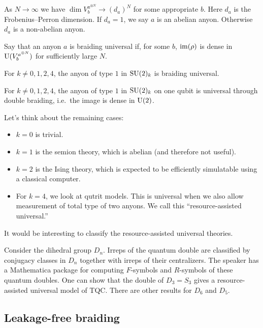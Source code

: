 \documentclass{amsart}
\begin{document}
As $N \to \infty$ we have $\dim V_b^{a^{\otimes N}} \to (d_a)^N$ for some appropriate $b$.
Here $d_a$ is the Frobenius--Perron dimension.
If $d_a = 1$, we say $a$ is an abelian anyon.
Otherwise $d_a$ is a non-abelian anyon.

Say that an anyon $a$ is braiding universal if, for some $b$, $\operatorname{im}(\rho)$ is dense in $\mathrm{U}(V_b^{a^{\otimes N}})$ for sufficiently large $N$.

\begin{thm}
  For $k \neq 0, 1, 2, 4$, the anyon of type $1$ in $\mathrm{SU}(2)_k$ is braiding universal.
\end{thm}

\begin{thm}
  For $k \neq 0, 1, 2, 4$, the anyon of type $1$ in $\mathrm{SU}(2)_k$ on one qubit is universal through double braiding, i.e.\ the image is dense in $\mathrm{U}(2)$.
\end{thm}

Let's think about the remaining cases:
\begin{itemize}
  \item $k = 0$ is trivial.
  \item $k = 1$ is the semion theory, which is abelian (and therefore not useful).
  \item $k = 2$ is the Ising theory, which is expected to be efficiently simulatable using a classical computer.
  \item For $k = 4$, we look at qutrit models.
    This is universal when we also allow measurement of total type of two anyons.
    We call this ``resource-assisted universal.''
\end{itemize}

It would be interesting to classify the resource-assisted universal theories.

\begin{ex}
  Consider the dihedral group $D_n$.
  Irreps of the quantum double are classified by conjugacy classes in $D_n$ together with irreps of their centralizers.
  The speaker has a Mathematica package for computing $F$-symbols and $R$-symbols of these quantum doubles.
  One can show that the double of $D_3 = S_3$ gives a resource-assisted universal model of TQC.
  There are other results for $D_6$ and $D_5$.
\end{ex}

\subsection{Leakage-free braiding}
\end{document}
